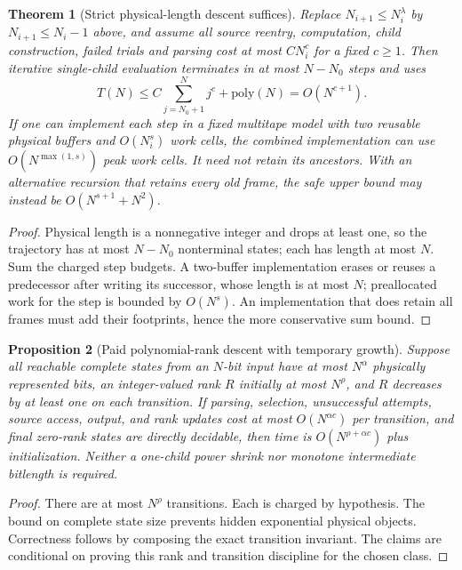 \documentclass[11pt]{article}
\newtheorem{theorem}{Theorem}
\newtheorem{proposition}[theorem]{Proposition}
\begin{document}
\begin{theorem}[Strict physical-length descent suffices]\label{thm:linear}
Replace $N_{i+1}\le N_i^\lambda$ by $N_{i+1}\le N_i-1$ above, and assume all source reentry, computation, child construction, failed trials and parsing cost at most $C N_i^c$ for a fixed $c\ge1$. Then iterative single-child evaluation terminates in at most $N-N_0$ steps and uses
\[
T(N)\le C\sum_{j=N_0+1}^N j^c+\mathrm{poly}(N)=O(N^{c+1}).
\]
If one can implement each step in a fixed multitape model with two reusable physical buffers and $O(N_i^s)$ work cells, the combined implementation can use $O(N^{\max(1,s)})$ \emph{peak} work cells. It need not retain its ancestors. With an alternative recursion that retains every old frame, the safe upper bound may instead be $O(N^{s+1}+N^2)$.
\end{theorem}
\begin{proof}
Physical length is a nonnegative integer and drops at least one, so the trajectory has at most $N-N_0$ nonterminal states; each has length at most $N$. Sum the charged step budgets. A two-buffer implementation erases or reuses a predecessor after writing its successor, whose length is at most $N$; preallocated work for the step is bounded by $O(N^s)$. An implementation that does retain all frames must add their footprints, hence the more conservative sum bound.
\end{proof}

\begin{proposition}[Paid polynomial-rank descent with temporary growth]
Suppose all reachable complete states from an $N$-bit input have at most $N^\alpha$ physically represented bits, an integer-valued rank $R$ initially at most $N^\rho$, and $R$ decreases by at least one on each transition. If parsing, selection, unsuccessful attempts, source access, output, and rank updates cost at most $O(N^{\alpha c})$ \emph{per transition}, and final zero-rank states are directly decidable, then time is $O(N^{\rho+\alpha c})$ plus initialization. Neither a one-child power shrink nor monotone intermediate bitlength is required.
\end{proposition}
\begin{proof}
There are at most $N^\rho$ transitions. Each is charged by hypothesis. The bound on complete state size prevents hidden exponential physical objects. Correctness follows by composing the exact transition invariant. The claims are conditional on proving this rank and transition discipline for the chosen class.
\end{proof}
\end{document}
